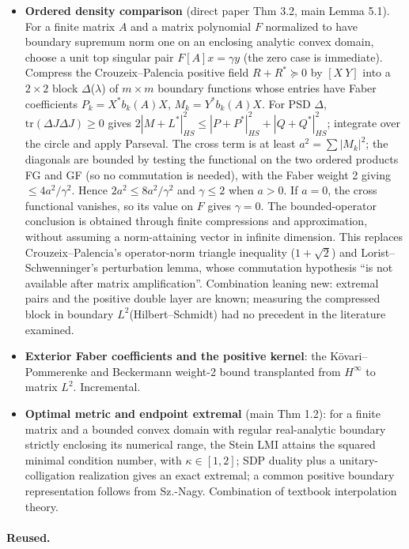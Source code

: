\documentclass[11pt]{article}
\begin{document}
\begin{itemize}
\item \textbf{Ordered density comparison} (direct paper Thm 3.2, main Lemma 5.1). For a finite matrix $A$ and a matrix polynomial $F$ normalized to have boundary supremum norm one on an enclosing analytic convex domain, choose a unit top singular pair $F[A]x=\gamma y$ (the zero case is immediate). Compress the Crouzeix--Palencia positive field $R+R^*\succeq0$ by $[X\ Y]$ into a $2\times2$ block $\Delta$($\lambda$) of $m\times m$ boundary functions whose entries have Faber coefficients $P_k=X^*b_k(A)X$, $M_k=Y^*b_k(A)X$. For PSD $\Delta$, $\mathrm{tr}(\Delta J\Delta J)\ge0$ gives $2|M+L^*|^2_{HS}\le|P+P^*|^2_{HS}+|Q+Q^*|^2_{HS}$; integrate over the circle and apply Parseval. The cross term is at least $a^2=\sum|M_k|^2$; the diagonals are bounded by testing the functional on the two ordered products FG and GF (so no commutation is needed), with the Faber weight 2 giving $\le4a^2/\gamma^2$. Hence $2a^2\le8a^2/\gamma^2$ and $\gamma \le 2$ when $a>0$. If $a=0$, the cross functional vanishes, so its value on $F$ gives $\gamma=0$. The bounded-operator conclusion is obtained through finite compressions and approximation, without assuming a norm-attaining vector in infinite dimension. This replaces Crouzeix--Palencia's operator-norm triangle inequality ($1+\sqrt{2}$) and Lorist--Schwenninger's perturbation lemma, whose commutation hypothesis ``is not available after matrix amplification''. Combination leaning new: extremal pairs and the positive double layer are known; measuring the compressed block in boundary $L^{2}$(Hilbert--Schmidt) had no precedent in the literature examined.
\item \textbf{Exterior Faber coefficients and the positive kernel}: the Kövari--Pommerenke and Beckermann weight-2 bound transplanted from $H^\infty$ to matrix $L^{2}$. Incremental.
\item \textbf{Optimal metric and endpoint extremal} (main Thm 1.2): for a finite matrix and a bounded convex domain with regular real-analytic boundary strictly enclosing its numerical range, the Stein LMI attains the squared minimal condition number, with $\kappa\in[1,2]$; SDP duality plus a unitary-colligation realization gives an exact extremal; a common positive boundary representation follows from Sz.-Nagy. Combination of textbook interpolation theory.
\end{itemize}

\paragraph{Reused.}
\end{document}

